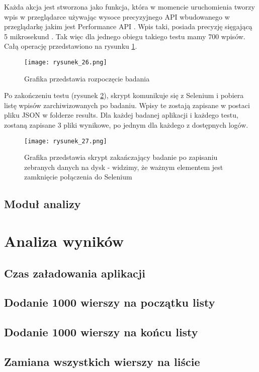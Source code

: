 Każda akcja jest stworzona jako funkcja, która w momencie uruchomienia tworzy wpis w przeglądarce używając wysoce precyzyjnego API wbudowanego
w przeglądarkę jakim jest Performance API \cite{mozilla-perf}. Wpis taki, posiada precyzję sięgającą 5 mikrosekund \cite{mozilla-high-res-api}.
Tak więc dla jednego obiegu takiego testu mamy 700 wpisów. Całą operację przedstawiono na rysunku \ref{fig:rysunek_26}.

\begin{figure}[!ht]
    \centering
    \texttt{[image: rysunek\_26.png]}
    \caption{Grafika przedstawia rozpoczęcie badania}
    \label{fig:rysunek_26}
\end{figure}

Po zakończeniu testu (rysunek \ref{fig:rysunek_27}), skrypt komunikuje się z Selenium i pobiera listę wpisów zarchiwizowanych po badaniu.
Wpisy te zostają zapisane w postaci pliku JSON w folderze results.
Dla każdej badanej aplikacji i każdego testu, zostaną zapisane 3 pliki wynikowe, po jednym dla każdego z dostępnych logów.

\begin{figure}[!ht]
    \centering
    \texttt{[image: rysunek\_27.png]}
    \caption{Grafika przedstawia skrypt zakańczający badanie po zapisaniu zebranych danych na dysk - widzimy, że ważnym elementem jest zamknięcie połączenia do Selenium}
    \label{fig:rysunek_27}
\end{figure}

\subsection{Moduł analizy}

\section{Analiza wyników}
\subsection{Czas załadowania aplikacji}
\subsection{Dodanie 1000 wierszy na początku listy}
\subsection{Dodanie 1000 wierszy na końcu listy}
\subsection{Zamiana wszystkich wierszy na liście}
